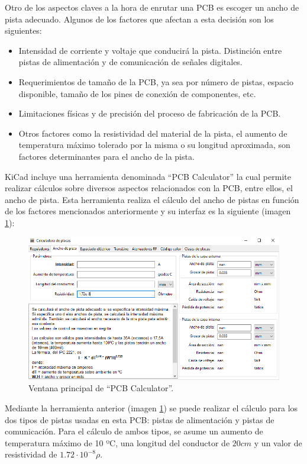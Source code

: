 Otro de los aspectos claves a la hora de enrutar una \ac{PCB} es escoger un ancho de pista adecuado. Algunos de los factores que afectan a esta decisión son los siguientes:
\begin{itemize}
    \item Intensidad de corriente y voltaje que conducirá la pista. Distinción entre pistas de alimentación y de comunicación de señales digitales.
    \item Requerimientos de tamaño de la \ac{PCB}, ya sea por número de pistas, espacio disponible, tamaño de los pines de conexión de componentes, etc.
    \item Limitaciones físicas y de precisión del proceso de fabricación de la \ac{PCB}.
    \item Otros factores como la resistividad del material de la pista, el aumento de temperatura máximo tolerado por la misma o su longitud aproximada, son factores determinantes para el ancho de la pista.
\end{itemize}

KiCad incluye una herramienta denominada ``\ac{PCB} Calculator'' la cual permite realizar cálculos sobre diversos aspectos relacionados con la \ac{PCB}, entre ellos, el ancho de pista. Esta herramienta realiza el cálculo del ancho de pistas en función de los factores mencionados anteriormente y su interfaz es la siguiente (imagen \ref{fig:Pcb_Calculator}):

\begin{figure}[H]
\centering 
\includegraphics[width=0.9\linewidth]{pictures/PCBCalculator.PNG}
\caption{Ventana principal de ``PCB Calculator''.}
\label{fig:Pcb_Calculator}
\end{figure}

Mediante la herramienta anterior (imagen \ref{fig:Pcb_Calculator}) se puede realizar el cálculo para los dos tipos de pistas usadas en esta \ac{PCB}: pistas de alimentación y pistas de comunicación. Para el cálculo de ambos tipos, se asume un aumento de temperatura máximo de 10 ºC, una longitud del conductor de $20cm$ y un valor de resistividad de $1.72 \cdot 10^{-8}\rho$.

